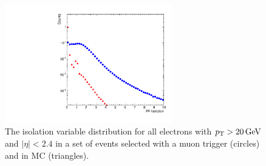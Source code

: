 \begin{figure}[!htbp]
    \centering
    \includegraphics[width=0.65\textwidth]{figures/iso.pdf}
    \caption{
        The \particleflow isolation variable distribution for all electrons
        with $p_{\mathrm{T}} > 20 \,\text{Ge\hspace{-.08em}V}$ and $|\eta| < 2.4$ in a set of events selected
        with a muon trigger (circles) and in \MADGRAPH \Ztoee MC (triangles).
    }
    \label{fig:pf_iso}
\end{figure}

